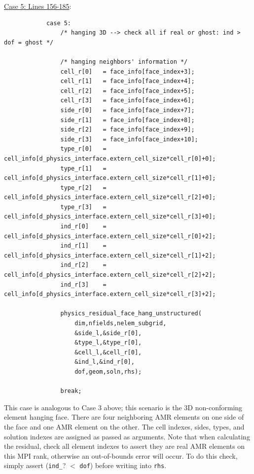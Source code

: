 \documentclass[11pt]{book}
\begin{document}
\noindent
\underline{Case 5: Lines 156-185}:
\begin{verbatim}
            case 5:
                /* hanging 3D --> check all if real or ghost: ind > dof = ghost */
                
                /* hanging neighbors' information */
                cell_r[0]   = face_info[face_index+3];
                cell_r[1]   = face_info[face_index+4];
                cell_r[2]   = face_info[face_index+5];
                cell_r[3]   = face_info[face_index+6];
                side_r[0]   = face_info[face_index+7];
                side_r[1]   = face_info[face_index+8];
                side_r[2]   = face_info[face_index+9];
                side_r[3]   = face_info[face_index+10];
                type_r[0]   = cell_info[d_physics_interface.extern_cell_size*cell_r[0]+0];
                type_r[1]   = cell_info[d_physics_interface.extern_cell_size*cell_r[1]+0];
                type_r[2]   = cell_info[d_physics_interface.extern_cell_size*cell_r[2]+0];
                type_r[3]   = cell_info[d_physics_interface.extern_cell_size*cell_r[3]+0];
                ind_r[0]    = cell_info[d_physics_interface.extern_cell_size*cell_r[0]+2];
                ind_r[1]    = cell_info[d_physics_interface.extern_cell_size*cell_r[1]+2];
                ind_r[2]    = cell_info[d_physics_interface.extern_cell_size*cell_r[2]+2];
                ind_r[3]    = cell_info[d_physics_interface.extern_cell_size*cell_r[3]+2];
                
                physics_residual_face_hang_unstructured(
                    dim,nfields,nelem_subgrid,
                    &side_l,&side_r[0],
                    &type_l,&type_r[0],
                    &cell_l,&cell_r[0],
                    &ind_l,&ind_r[0],
                    dof,geom,soln,rhs);
                
                break;
\end{verbatim}
This case is analogous to Case 3 above; this scenario is the 3D non-conforming element hanging face. There are four neighboring AMR elements on one side of the face and one AMR element on the other. The cell indexes, sides, types, and solution indexes are assigned as passed as arguments. 
Note that when calculating the residual, check all element indexes to assert they are real AMR elements on this MPI rank, otherwise an out-of-bounds error will occur. To do this check, simply assert (\texttt{ind\_}? $<$ \texttt{dof}) before writing into \texttt{rhs}.

\newpage
\end{document}
